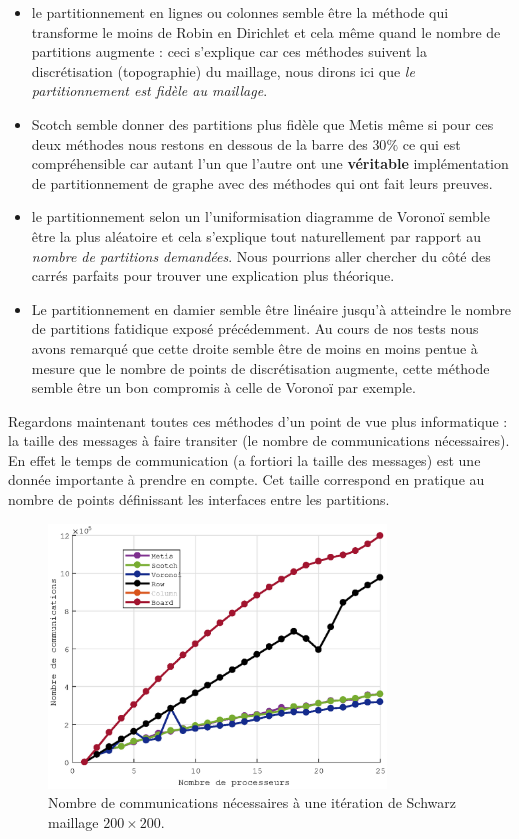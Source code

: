 \documentclass[a4paper,11pt]{article}
\begin{document}
\begin{itemize}
	\item le partitionnement en lignes ou colonnes semble être la méthode qui transforme le moins de Robin en Dirichlet et cela même quand le nombre de partitions augmente : ceci s'explique car ces méthodes suivent la discrétisation (topographie) du maillage, nous dirons ici que \textit{le partitionnement est fidèle au maillage}.
	\item Scotch semble donner des partitions plus fidèle que Metis même si pour ces deux méthodes nous restons en dessous de la barre des $30\%$ ce qui est compréhensible car autant l'un que l'autre ont une \textbf{véritable} implémentation de partitionnement de graphe avec des méthodes qui ont fait leurs preuves.
	\item le partitionnement selon un l'uniformisation diagramme de Voronoï semble être la plus aléatoire et cela s'explique tout naturellement par rapport au \textit{nombre de partitions demandées}. Nous pourrions aller chercher du côté des carrés parfaits pour trouver une explication plus théorique.
	\item Le partitionnement en damier semble être linéaire jusqu'à atteindre le nombre de partitions fatidique exposé précédemment. Au cours de nos tests nous avons remarqué que cette droite semble être de moins en moins pentue à mesure que le nombre de points de discrétisation augmente, cette méthode semble être un bon compromis à celle de Voronoï par exemple.
\end{itemize}
\noindent Regardons maintenant toutes ces méthodes d'un point de vue plus informatique : la taille des messages à faire transiter (le nombre de communications nécessaires). En effet le temps de communication (a fortiori la taille des messages) est une donnée importante à prendre en compte. Cet taille correspond en pratique au nombre de points définissant les interfaces entre les partitions.
\begin{figure}[H]
	\centering
	\includegraphics[width=0.8\textwidth]{communic.eps}
	\caption{Nombre de communications nécessaires à une itération de Schwarz maillage $200\times200$.}
\end{figure}
\end{document}

